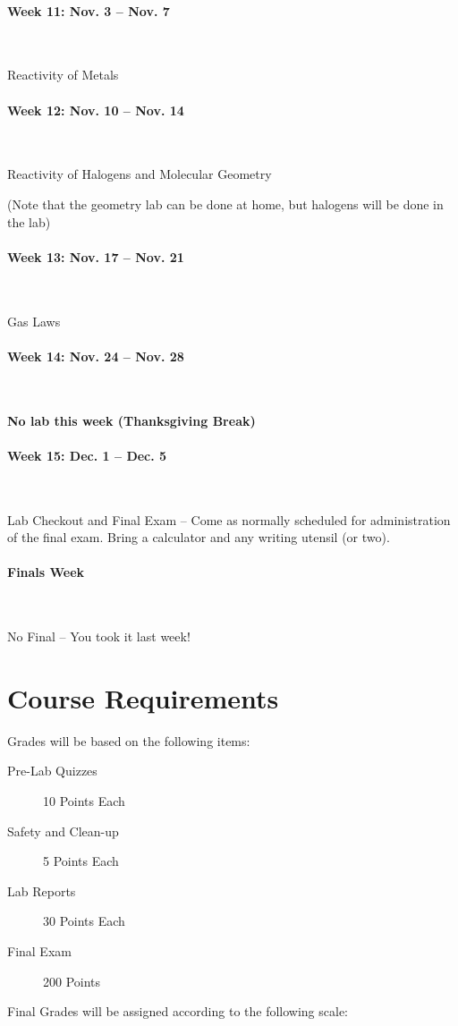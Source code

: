 \documentclass[12pt, letterpaper]{article}
\begin{document}
\paragraph{Week 11: Nov. 3 -- Nov. 7}~

Reactivity of Metals

\paragraph{Week 12: Nov. 10 -- Nov. 14}~

Reactivity of Halogens and Molecular Geometry

(Note that the geometry lab can be done at home, but halogens will be done in the lab)

\paragraph{Week 13: Nov. 17 -- Nov. 21}~

Gas Laws

\paragraph{Week 14: Nov. 24 -- Nov. 28}~

\textbf{No lab this week (Thanksgiving Break)}

\paragraph{Week 15: Dec. 1 -- Dec. 5}~

Lab Checkout and Final Exam -- Come as normally scheduled for administration of the final exam. Bring a calculator and any writing utensil (or two).

\paragraph{Finals Week}~

No Final -- You took it last week!

\section*{Course Requirements}
Grades will be based on the following items:
\begin{description}
	\item[Pre-Lab Quizzes] 10 Points Each
	\item[Safety and Clean-up] 5 Points Each
	\item[Lab Reports] 30 Points Each
	\item[Final Exam] 200 Points
\end{description}
Final Grades will be assigned according to the following scale:
\end{document}
